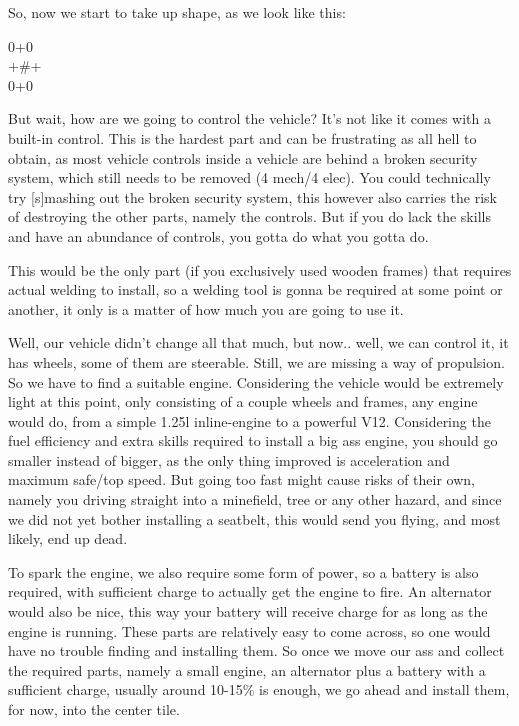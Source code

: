 \documentclass[11pt]{report}
\begin{document}
So, now we start to take up shape, as we look like this:

\vspace{0.5\baselineskip}
\begin{spacing}{0.75}
0+0\\
+\#+\\
0+0
\end{spacing}
\vspace{0.5\baselineskip}

But wait, how are we going to control the vehicle? It's not like it comes with a built-in control. This is the hardest part and can be frustrating as all hell to obtain, as most vehicle controls inside a vehicle are behind a broken security system, which still needs to be removed (4 mech/4 elec). You could technically try [s]mashing out the broken security system, this however also carries the risk of destroying the other parts, namely the controls. But if you do lack the skills and have an abundance of controls, you gotta do what you gotta do.

This would be the only part (if you exclusively used wooden frames) that requires actual welding to install, so a welding tool is gonna be required at some point or another, it only is a matter of how much you are going to use it.

Well, our vehicle didn't change all that much, but now.. well, we can control it, it has wheels, some of them are steerable. Still, we are missing a way of propulsion. So we have to find a suitable engine. Considering the vehicle would be extremely light at this point, only consisting of a couple wheels and frames, any engine would do, from a simple 1.25l inline-engine to a powerful V12. Considering the fuel efficiency and extra skills required to install a big ass engine, you should go smaller instead of bigger, as the only thing improved is acceleration and maximum safe/top speed. But going too fast might cause risks of their own, namely you driving straight into a minefield, tree or any other hazard, and since we did not yet bother installing a seatbelt, this would send you flying, and most likely, end up dead.

To spark the engine, we also require some form of power, so a battery is also required, with sufficient charge to actually get the engine to fire. An alternator would also be nice, this way your battery will receive charge for as long as the engine is running. These parts are relatively easy to come across, so one would have no trouble finding and installing them. So once we move our ass and collect the required parts, namely a small engine, an alternator plus a battery with a sufficient charge, usually around 10-15\% is enough, we go ahead and install them, for now, into the center tile.
\end{document}
